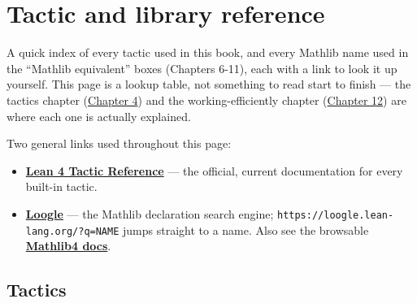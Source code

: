 \chapter*{Tactic and library reference}
\setcounter{section}{0}\label{sec:root:tactic-and-library-reference:1}

A quick index of every tactic used in this book, and every Mathlib name used in the ``Mathlib equivalent'' boxes (Chapters 6-11), each with a link to look it up yourself. This page is a lookup table, not something to read start to finish --- the tactics chapter (\hyperref[sec:04-tactics:00-index:1]{Chapter 4}) and the working-efficiently chapter (\hyperref[sec:12-working-efficiently:00-index:1]{Chapter 12}) are where each one is actually explained.

Two general links used throughout this page:

\begin{itemize}
\tightlist
\item
  \textbf{\href{https://lean-lang.org/doc/reference/latest/Tactic-Proofs/Tactic-Reference/}{Lean 4 Tactic Reference}} --- the official, current documentation for every built-in tactic.
\item
  \textbf{\href{https://loogle.lean-lang.org/}{Loogle}} --- the Mathlib declaration search engine; \texttt{https://loogle.lean-lang.org/?q=NAME} jumps straight to a name. Also see the browsable \textbf{\href{https://leanprover-community.github.io/mathlib4_docs/}{Mathlib4 docs}}.
\end{itemize}

\section{Tactics}\label{sec:root:tactic-and-library-reference:2}


